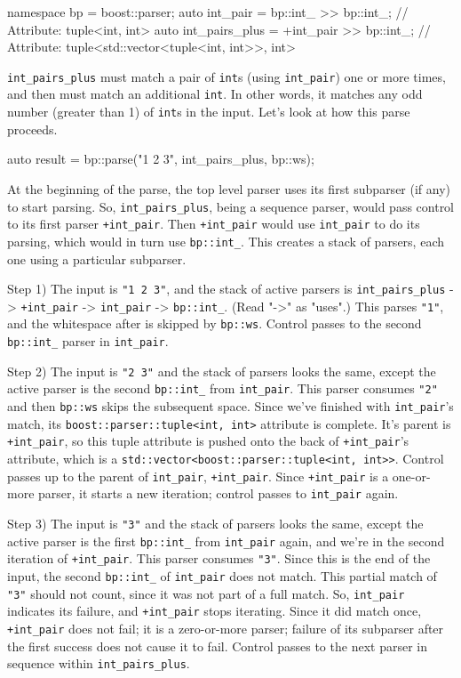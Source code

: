 \begin{code}
namespace bp = boost::parser;
auto int_pair = bp::int_ >> bp::int_;         // Attribute: tuple<int, int>
auto int_pairs_plus = +int_pair >> bp::int_;  // Attribute: tuple<std::vector<tuple<int, int>>, int>
\end{code}

\texttt{int\_pairs\_plus} must match a pair of \texttt{int}s (using \texttt{int\_pair}) one or more times, and then must match an additional \texttt{int}. In other words, it matches any odd number (greater than 1) of \texttt{int}s in the input. Let's look at how this parse proceeds.

\begin{code}
auto result = bp::parse("1 2 3", int_pairs_plus, bp::ws);
\end{code}

At the beginning of the parse, the top level parser uses its first subparser (if any) to start parsing. So, \texttt{int\_pairs\_plus}, being a sequence parser, would pass control to its first parser \texttt{+int\_pair}. Then \texttt{+int\_pair} would use \texttt{int\_pair} to do its parsing, which would in turn use \texttt{bp::int\_}. This creates a stack of parsers, each one using a particular subparser.

Step 1) The input is \texttt{"1 2 3"}, and the stack of active parsers is \texttt{int\_pairs\_plus} -> \texttt{+int\_pair} -> \texttt{int\_pair} -> \texttt{bp::int\_}. (Read "-\textgreater" as "uses".) This parses \texttt{"1"}, and the whitespace after is skipped by \texttt{bp::ws}. Control passes to the second \texttt{bp::int\_} parser in \texttt{int\_pair}.

Step 2) The input is \texttt{"2 3"} and the stack of parsers looks the same, except the active parser is the second \texttt{bp::int\_} from \texttt{int\_pair}. This parser consumes \texttt{"2"} and then \texttt{bp::ws} skips the subsequent space. Since we've finished with \texttt{int\_pair}'s match, its \texttt{boost::parser::tuple<int, int>} attribute is complete. It's parent is \texttt{+int\_pair}, so this tuple attribute is pushed onto the back of \texttt{+int\_pair}'s attribute, which is a \texttt{std::vector<boost::parser::tuple<int, int>>}. Control passes up to the parent of \texttt{int\_pair}, \texttt{+int\_pair}. Since \texttt{+int\_pair} is a one-or-more parser, it starts a new iteration; control passes to \texttt{int\_pair} again.

Step 3) The input is \texttt{"3"} and the stack of parsers looks the same, except the active parser is the first \texttt{bp::int\_} from \texttt{int\_pair} again, and we're in the second iteration of \texttt{+int\_pair}. This parser consumes \texttt{"3"}. Since this is the end of the input, the second \texttt{bp::int\_} of \texttt{int\_pair} does not match. This partial match of \texttt{"3"} should not count, since it was not part of a full match. So, \texttt{int\_pair} indicates its failure, and \texttt{+int\_pair} stops iterating. Since it did match once, \texttt{+int\_pair} does not fail; it is a zero-or-more parser; failure of its subparser after the first success does not cause it to fail. Control passes to the next parser in sequence within \texttt{int\_pairs\_plus}.

